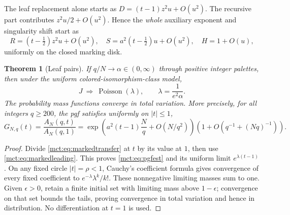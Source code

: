 \documentclass[11pt]{article}
\newtheorem{theorem}{Theorem}[section]
\theoremstyle{definition}
\begin{document}
The leaf replacement alone starts as $D=(t-1)z^2u+O(u^2)$. The recursive part contributes $z^2u/2+O(u^2)$. Hence the \emph{whole} auxiliary exponent and singularity shift start as
\begin{equation}\label{mct:eq:markedleading}
 R=(t-\tfrac12)z^2u+O(u^2),\quad
 S=a^2(t-\tfrac12)u+O(u^2),\quad H=1+O(u),
\end{equation}
uniformly on the closed marking disk.

\begin{theorem}[Leaf pairs]\label{mct:thm:poisson}
If $q/N\to\alpha\in(0,\infty)$ through positive integer palettes, then under the uniform colored-isomorphism-class model,
\[
 J\ \Longrightarrow\ \operatorname{Poisson}(\lambda),\qquad
 \lambda=\frac{1}{e^2\alpha}.
\]
The probability mass functions converge in total variation. More precisely, for all integers $q\ge200$, the pgf satisfies uniformly on $|t|\le1$,
\begin{equation}\label{mct:eq:pgfest}
 G_{N,q}(t)=\frac{A_N(q,t)}{A_N(q,1)}
 =\exp\left(a^2(t-1)\frac Nq+O(N/q^2)\right)
       \left(1+O(q^{-1}+(Nq)^{-1})\right).
\end{equation}
\end{theorem}
\begin{proof}
Divide \eqref{mct:eq:markedtransfer} at $t$ by its value at $1$, then use \eqref{mct:eq:markedleading}. This proves \eqref{mct:eq:pgfest} and its uniform limit $e^{\lambda(t-1)}$. On any fixed circle $|t|=\rho<1$, Cauchy's coefficient formula gives convergence of every fixed coefficient to $e^{-\lambda}\lambda^k/k!$. These nonnegative limiting masses sum to one. Given $\epsilon>0$, retain a finite initial set with limiting mass above $1-\epsilon$; convergence on that set bounds the tails, proving convergence in total variation and hence in distribution. No differentiation at $t=1$ is used.
\end{proof}
\end{document}
